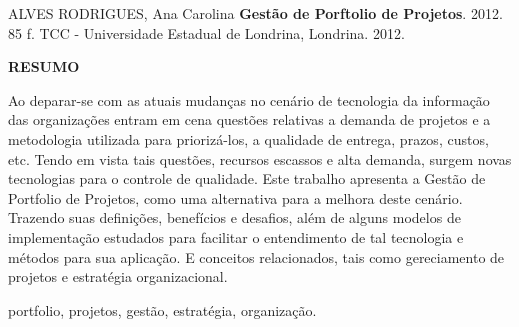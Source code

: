 \singlespacing
\noindent ALVES RODRIGUES,  Ana Carolina  {\bf Gest\~ao de Porftolio de Projetos}. 2012. 85 f. TCC - Universidade Estadual de Londrina, Londrina. 2012. \\
\begin{center}
{\bf {\Large RESUMO}}
\end{center}
Ao deparar-se com as atuais mudan\c{c}as no cen\'{a}rio de tecnologia da informa\c{c}\~ao das organiza\c{c}\~oes entram em cena quest\~oes relativas a 
demanda de projetos e a metodologia utilizada para prioriz\'{a}-los, a qualidade de entrega, prazos, custos, etc. Tendo em vista tais quest\~{o}es, recursos 
escassos e alta demanda, surgem novas tecnologias para o controle de qualidade. Este trabalho apresenta a Gest\~{a}o de Portfolio de Projetos, como uma alternativa
para a melhora deste cen\'{a}rio. Trazendo suas defini\c{c}\~oes, benef\'{i}cios e desafios, al\'{e}m de alguns modelos de implementa\c{c}\~ao estudados 
para facilitar o entendimento de tal tecnologia e m\'{e}todos para sua aplica\c{c}\~ao. E conceitos relacionados, tais como gereciamento de projetos e 
estrat\'{e}gia organizacional.
\newline

  portfolio, projetos, gest\~{a}o, estrat\'{e}gia, organiza\c{c}\~ao.
 
